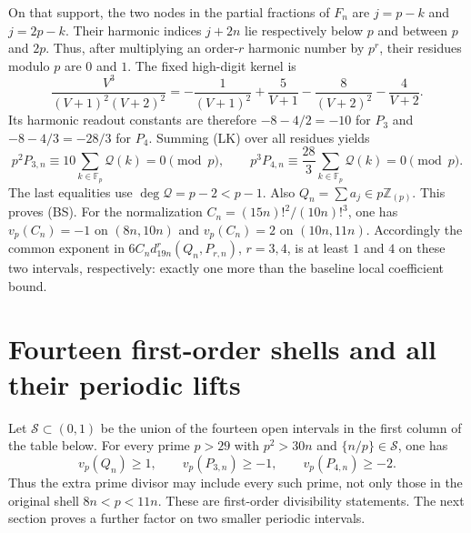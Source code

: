 \documentclass[11pt]{article}
\begin{document}
On that support, the two nodes in the partial fractions of $F_n$ are
$j=p-k$ and $j=2p-k$.  Their harmonic indices $j+2n$ lie respectively
below $p$ and between $p$ and $2p$.  Thus, after multiplying an order-$r$
harmonic number by $p^r$, their residues modulo $p$ are $0$ and $1$.
The fixed high-digit kernel is
\[
 \frac{V^3}{(V+1)^2(V+2)^2}
 =-\frac1{(V+1)^2}+\frac5{V+1}
   -\frac8{(V+2)^2}-\frac4{V+2}.
\]
Its harmonic readout constants are therefore $-8-4/2=-10$ for $P_3$ and
$-8-4/3=-28/3$ for $P_4$.  Summing (LK) over all residues yields
\[
 p^2P_{3,n}\equiv10\sum_{k\in\mathbb F_p}\mathcal Q(k)=0\pmod p,
 \qquad
 p^3P_{4,n}\equiv\frac{28}{3}
       \sum_{k\in\mathbb F_p}\mathcal Q(k)=0\pmod p.
\]
The last equalities use $\deg\mathcal Q=p-2<p-1$.
Also $Q_n=\sum a_j\in p\mathbb Z_{(p)}$.  This proves (BS).
For the normalization $C_n=(15n)!^2/(10n)!^3$, one has
$v_p(C_n)=-1$ on $(8n,10n)$ and $v_p(C_n)=2$ on $(10n,11n)$.
Accordingly the common exponent in
$6C_nd_{19n}^r(Q_n,P_{r,n})$, $r=3,4$, is at least $1$ and $4$ on these
two intervals, respectively: exactly one more than the baseline local
coefficient bound.

\section{Fourteen first-order shells and all their periodic lifts}
Let $\mathcal S\subset(0,1)$ be the union of the fourteen open intervals
in the first column of the table below.  For every prime $p>29$ with
$p^2>30n$ and $\{n/p\}\in\mathcal S$, one has
\[
 v_p(Q_n)\ge1,\qquad v_p(P_{3,n})\ge-1,\qquad
 v_p(P_{4,n})\ge-2.                                    \tag{PS}
\]
Thus the extra prime divisor may include every such prime, not only those
in the original shell $8n<p<11n$.  These are first-order divisibility statements. The next section
proves a further factor on two smaller periodic intervals.
\end{document}
